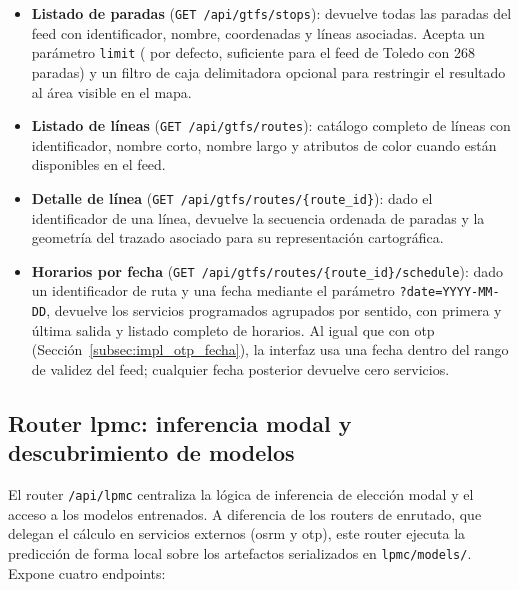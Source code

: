 \begin{itemize}
  \item \textbf{Listado de paradas} (\texttt{GET /api/gtfs/stops}): devuelve todas las paradas del feed con identificador, nombre, coordenadas y líneas asociadas. Acepta un parámetro \texttt{limit} ( por defecto, suficiente para el feed de Toledo con 268 paradas) y un filtro de caja delimitadora opcional para restringir el resultado al área visible en el mapa.

  \item \textbf{Listado de líneas} (\texttt{GET /api/gtfs/routes}): catálogo completo de líneas con identificador, nombre corto, nombre largo y atributos de color cuando están disponibles en el feed.

  \item \textbf{Detalle de línea} (\texttt{GET /api/gtfs/routes/\{route\_id\}}): dado el identificador de una línea, devuelve la secuencia ordenada de paradas y la geometría del trazado asociado para su representación cartográfica.

  \item \textbf{Horarios por fecha} (\texttt{GET /api/gtfs/routes/\{route\_id\}/schedule}): dado un identificador de ruta y una fecha mediante el parámetro \texttt{?date=YYYY-MM-DD}, devuelve los servicios programados agrupados por sentido, con primera y última salida y listado completo de horarios. Al igual que con \gls{otp} (Sección~\ref{subsec:impl_otp_fecha}), la interfaz usa una fecha dentro del rango de validez del feed; cualquier fecha posterior devuelve cero servicios.
\end{itemize}

\subsection[Router LPMC: inferencia modal y descubrimiento de modelos]{Router \gls{lpmc}: inferencia modal y descubrimiento de modelos}
\label{subsec:impl_backend_lpmc}

El router \texttt{/api/lpmc} centraliza la lógica de inferencia de elección modal y el acceso a los modelos entrenados. A diferencia de los routers de enrutado, que delegan el cálculo en servicios externos (\gls{osrm} y \gls{otp}), este router ejecuta la predicción de forma local sobre los artefactos serializados en \texttt{lpmc/models/}. Expone cuatro endpoints:


